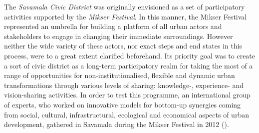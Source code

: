 \documentclass[11pt]{report}
\begin{document}
The \textit{Savamala Civic District} was originally envisioned as a set of participatory activities supported by the \textit{Mikser Festival}. In this manner, the Mikser Festival represented an umbrella for building a platform of all urban actors and stakeholders to engage in changing their immediate surroundings. However neither the wide variety of these actors, nor exact steps and end states in this process, were to a great extent clarified beforehand.
Its priority goal was to create a sort of civic district as a long-term participatory realm for taking the most of a range of opportunities for non-institutionalised, flexible and dynamic urban transformations through various levels of sharing: knowledge-, experience- and vision-sharing activities. In order to test this programme, an international group of experts, who worked on innovative models for bottom-up synergies coming from social, cultural, infrastructural, ecological and economical aspects of urban development, gathered in Savamala during the Mikser Festival in 2012 (\href{Cvetinovic}{\citealt{cvetinovic_engine_2013}}).
\end{document}
